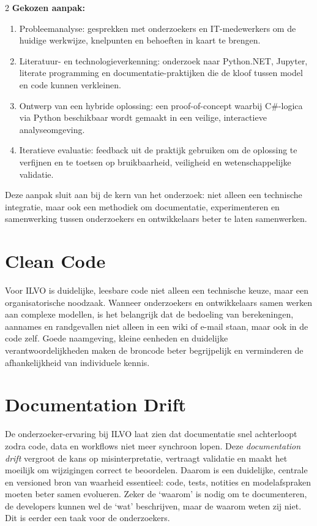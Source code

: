 \documentclass[a0,portrait]{hogent-poster}
\begin{document}
\begin{multicols}{2}
\textbf{Gekozen aanpak:}
\begin{enumerate}
  \item Probleemanalyse: gesprekken met onderzoekers en IT-medewerkers om de huidige werkwijze, knelpunten en behoeften in kaart te brengen.
  \item Literatuur- en technologieverkenning: onderzoek naar Python.NET, Jupyter, literate programming en documentatie-praktijken die de kloof tussen model en code kunnen verkleinen.
  \item Ontwerp van een hybride oplossing: een proof-of-concept waarbij C\#-logica via Python beschikbaar wordt gemaakt in een veilige, interactieve analyseomgeving.
  \item Iteratieve evaluatie: feedback uit de praktijk gebruiken om de oplossing te verfijnen en te toetsen op bruikbaarheid, veiligheid en wetenschappelijke validatie.
\end{enumerate}

Deze aanpak sluit aan bij de kern van het onderzoek: niet alleen een technische integratie, maar ook een methodiek om documentatie, experimenteren en samenwerking tussen onderzoekers en ontwikkelaars beter te laten samenwerken.

\section{Clean Code}

Voor ILVO is duidelijke, leesbare code niet alleen een technische keuze, maar een organisatorische noodzaak. Wanneer onderzoekers en ontwikkelaars samen werken aan complexe modellen, is het belangrijk dat de bedoeling van berekeningen, aannames en randgevallen niet alleen in een wiki of e-mail staan, maar ook in de code zelf. Goede naamgeving, kleine eenheden en duidelijke verantwoordelijkheden maken de broncode beter begrijpelijk en verminderen de afhankelijkheid van individuele kennis.

\section{Documentation Drift}

De onderzoeker-ervaring bij ILVO laat zien dat documentatie snel achterloopt zodra code, data en workflows niet meer synchroon lopen. Deze \emph{documentation drift} vergroot de kans op misinterpretatie, vertraagt validatie en maakt het moeilijk om wijzigingen correct te beoordelen. Daarom is een duidelijke, centrale en versioned bron van waarheid essentieel: code, tests, notities en modelafspraken moeten beter samen evolueren.
Zeker de `waarom' is nodig om te documenteren, de developers kunnen wel de `wat' beschrijven, maar de waarom weten zij niet. Dit is eerder een taak voor de onderzoekers.


\end{multicols}
\end{document}
